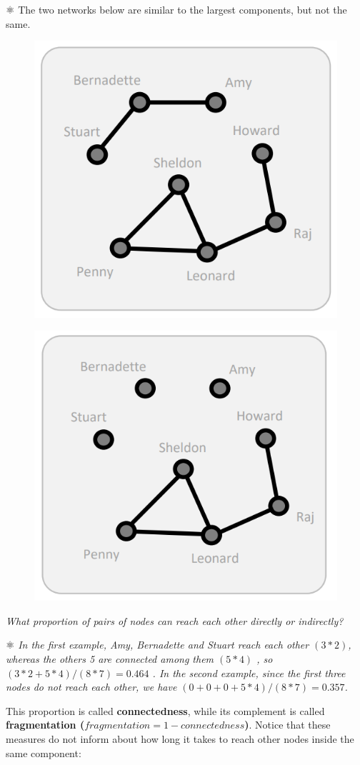 \documentclass[
  notitlepage,
  onecolumn,
  openany]{book}
\begin{document}
⚛️ The two networks below are similar to the largest components, but not the same.

\begin{figure}[h!]

{\centering \includegraphics[width=0.5\linewidth]{images/03-Cohesion measures/Untitled 2} 

}

\end{figure}

\begin{figure}[h!]

{\centering \includegraphics[width=0.5\linewidth]{images/03-Cohesion measures/Untitled 3} 

}

\end{figure}

\emph{What proportion of pairs of nodes can reach each other directly or indirectly?}

⚛️ \emph{In the first example, Amy, Bernadette and Stuart reach each other \((3*2)\), whereas the others 5 are connected among them \((5*4)\) , so \((3*2+5*4)/(8*7) = 0.464\) .
In the second example, since the first three nodes do not reach each other, we have \((0+0+0+5*4)/(8*7) = 0.357\).}

This proportion is called \textbf{connectedness}, while its complement is called \textbf{fragmentation (\(fragmentation = 1-connectedness\))}. Notice that these measures do not inform about how long it takes to reach other nodes inside the same component:
\end{document}
